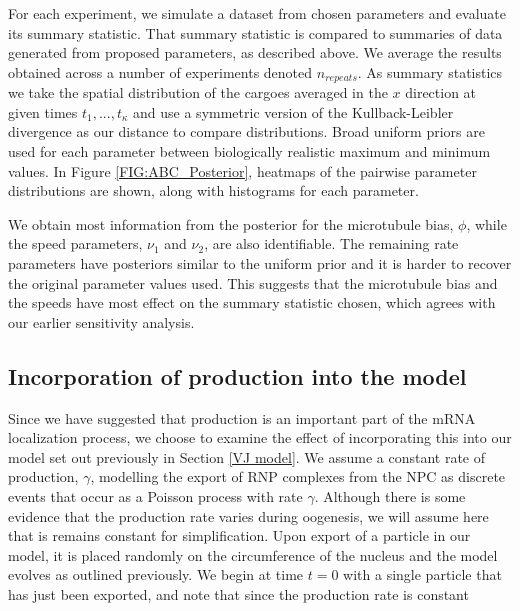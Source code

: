 \documentclass[twocolumn]{biophys}
\begin{document}
For each experiment, we simulate a dataset from chosen parameters and evaluate its summary statistic. 
That summary statistic is compared to summaries of data generated from proposed parameters, as described above.
We average the results obtained across a number of experiments denoted $n_{repeats}$.
As summary statistics we take the spatial distribution of the cargoes averaged in the $x$ direction at given times $t_1,...,t_{\kappa}$ and use a symmetric version of the Kullback-Leibler divergence as our distance to compare distributions.
Broad uniform priors are used for each parameter between biologically realistic maximum and minimum values.
In Figure \ref{FIG:ABC_Posterior}, heatmaps of the pairwise parameter distributions are shown, along with histograms for each parameter. 

We obtain most information from the posterior for the microtubule bias, $\phi$, while the speed parameters, $\nu_1$ and $\nu_2$, are also identifiable. 
The remaining rate parameters have posteriors similar to the uniform prior and it is harder to recover the original parameter values used.
This suggests that the microtubule bias and the speeds have most effect on the summary statistic chosen, which agrees with our earlier sensitivity analysis.

\subsection{Incorporation of production into the model}

Since we have suggested that production is an important part of the mRNA localization process, we choose to examine the effect of incorporating this into our model set out previously in Section \ref{VJ model}.
We assume a constant rate of production, $\gamma$, modelling the export of RNP complexes from the NPC as discrete events that occur as a Poisson process with rate $\gamma$.
Although there is some evidence that the production rate varies during oogenesis, we will assume here that is remains constant for simplification.
Upon export of a particle in our model, it is placed randomly on the circumference of the nucleus and the model evolves as outlined previously.
We begin at time $t=0$ with a single particle that has just been exported, and note that since the production rate is constant 
\end{document}
